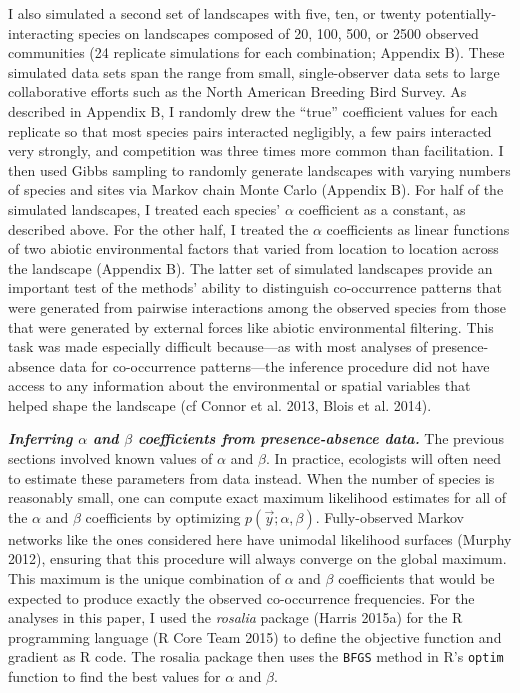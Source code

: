 \documentclass[12pt,]{article}
\begin{document}
\begin{spacing}{1.9}
\begin{flushleft}
I also simulated a second set of landscapes with five, ten, or twenty
potentially-interacting species on landscapes composed of 20, 100, 500,
or 2500 observed communities (24 replicate simulations for each
combination; Appendix B). These simulated data sets span the range from
small, single-observer data sets to large collaborative efforts such as
the North American Breeding Bird Survey. As described in Appendix B, I
randomly drew the ``true'' coefficient values for each replicate so that
most species pairs interacted negligibly, a few pairs interacted very
strongly, and competition was three times more common than facilitation.
I then used Gibbs sampling to randomly generate landscapes with varying
numbers of species and sites via Markov chain Monte Carlo (Appendix B).
For half of the simulated landscapes, I treated each species' \(\alpha\)
coefficient as a constant, as described above. For the other half, I
treated the \(\alpha\) coefficients as linear functions of two abiotic
environmental factors that varied from location to location across the
landscape (Appendix B). The latter set of simulated landscapes provide
an important test of the methods' ability to distinguish co-occurrence
patterns that were generated from pairwise interactions among the
observed species from those that were generated by external forces like
abiotic environmental filtering. This task was made especially difficult
because---as with most analyses of presence-absence data for
co-occurrence patterns---the inference procedure did not have access to
any information about the environmental or spatial variables that helped
shape the landscape (cf Connor et al. 2013, Blois et al. 2014).

\textbf{\emph{Inferring \(\alpha\) and \(\beta\) coefficients from
presence-absence data.}} The previous sections involved known values of
\(\alpha\) and \(\beta\). In practice, ecologists will often need to
estimate these parameters from data instead. When the number of species
is reasonably small, one can compute exact maximum likelihood estimates
for all of the \(\alpha\) and \(\beta\) coefficients by optimizing
\(p(\vec{y}; \alpha, \beta)\). Fully-observed Markov networks like the
ones considered here have unimodal likelihood surfaces (Murphy 2012),
ensuring that this procedure will always converge on the global maximum.
This maximum is the unique combination of \(\alpha\) and \(\beta\)
coefficients that would be expected to produce exactly the observed
co-occurrence frequencies. For the analyses in this paper, I used the
\emph{rosalia} package (Harris 2015a) for the R programming language (R
Core Team 2015) to define the objective function and gradient as R code.
The rosalia package then uses the \texttt{BFGS} method in R's
\texttt{optim} function to find the best values for \(\alpha\) and
\(\beta\).


\end{flushleft}
\end{spacing}
\end{document}
